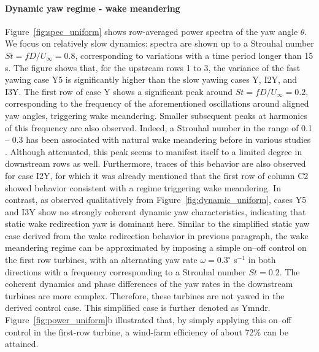 	\paragraph{Dynamic yaw regime - wake meandering}
	Figure~\ref{fig:spec_uniform} shows row-averaged power spectra of the yaw angle $\theta$. We focus on relatively slow dynamics: spectra are shown up to a Strouhal number $St = f D/U_\infty = 0.8$, corresponding to variations with a time period longer than 15 s. The figure shows that, for the upstream rows 1 to 3, the variance of the fast yawing case Y5 is significantly higher than the slow yawing cases Y, I2Y, and I3Y. The first row of case Y shows a significant peak around $St = f D/U_\infty= 0.2$, corresponding to the frequency of the aforementioned oscillations around aligned yaw angles, triggering wake meandering. Smaller subsequent peaks at harmonics of this frequency are also observed. Indeed, a Strouhal number in the range of 0.1 -- 0.3 has been associated with natural wake meandering before in various studies \citep{medici2008measurements, howard2015statistics}. Although attenuated, this peak seems to manifest itself to a limited degree in downstream rows as well. Furthermore, traces of this behavior are also observed for case I2Y, for which it was already mentioned that the first row of column C2 showed behavior consistent with a regime triggering wake meandering. In contrast, as observed qualitatively from Figure~\ref{fig:dynamic_uniform}, cases Y5 and I3Y show no strongly coherent dynamic yaw characteristics, indicating that static wake redirection yaw is dominant here. Similar to the simplified static yaw case derived from the wake redirection behavior in previous paragraph, the wake meandering regime can be approximated by imposing a simple on--off control on the first row turbines, with an alternating yaw rate $\omega = 0.3^\circ$ s$^{-1}$ in both directions with a frequency corresponding to a Strouhal number $St = 0.2$. The coherent dynamics and phase differences of the yaw rates in the downstream turbines are more complex. Therefore, these turbines are not yawed in the derived control case. This simplified case is further denoted as Ymndr. Figure~\ref{fig:power_uniform}b illustrated that, by simply applying this on--off control in the first-row turbine, a wind-farm efficiency of about 72\% can be attained.
	
